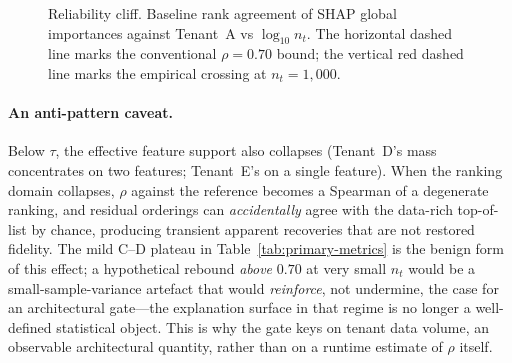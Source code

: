 \documentclass[conference]{IEEEtran}
\newcommand{\nT}{n_t}
\begin{document}
\begin{figure}[t]
  \centering
  \caption{Reliability cliff. Baseline rank agreement of SHAP global
  importances against Tenant~A vs $\log_{10} \nT$. The horizontal
  dashed line marks the conventional $\rho = 0.70$ bound; the vertical
  red dashed line marks the empirical crossing at $\nT = 1{,}000$.}
  \label{fig:cliff}
\end{figure}

\paragraph*{An anti-pattern caveat.} Below $\tau$, the effective feature
support also collapses (Tenant~D's mass concentrates on two features;
Tenant~E's on a single feature). When the ranking domain collapses,
$\rho$ against the reference becomes a Spearman of a degenerate ranking,
and residual orderings can \emph{accidentally} agree with the
data-rich top-of-list by chance, producing transient apparent
recoveries that are not restored fidelity. The mild C--D plateau in
Table~\ref{tab:primary-metrics} is the benign form of this effect; a
hypothetical rebound \emph{above} $0.70$ at very small $\nT$ would be a
small-sample-variance artefact that would \emph{reinforce}, not
undermine, the case for an architectural gate---the explanation surface
in that regime is no longer a well-defined statistical object. This is
why the gate keys on tenant data volume, an observable architectural
quantity, rather than on a runtime estimate of $\rho$ itself.
\end{document}

